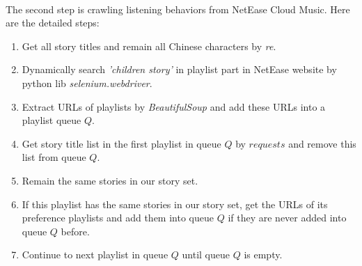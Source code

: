 \documentclass[sigconf]{acmart}
\begin{document}
\\
The second step is crawling listening behaviors from NetEase Cloud Music. Here are the detailed steps:
\begin{enumerate}
\item Get all story titles and remain all Chinese characters by \emph{re}.
\item Dynamically search \emph{'children story'} in playlist part in NetEase website by python lib \emph{selenium.webdriver}.
\item Extract URLs of playlists by \emph{BeautifulSoup} and add these URLs into a playlist queue $Q$.
\item Get story title list in the first playlist in queue $Q$ by $requests$ and remove this list from queue $Q$.
\item Remain the same stories in our story set.
\item If this playlist has the same stories in our story set, get the URLs of its preference playlists and add them into queue $Q$ if they are never added into queue $Q$ before.
\item Continue to next playlist in queue $Q$ until queue $Q$ is empty.
\end{enumerate}
\end{document}
